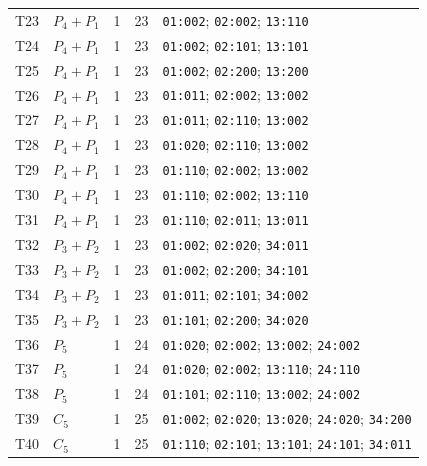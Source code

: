 \begin{longtable}{llrrp{78mm}}
T23 & $P_{4}+P_{1}$ & 1 & 23 & \texttt{01:002}; \texttt{02:002}; \texttt{13:110}\\
T24 & $P_{4}+P_{1}$ & 1 & 23 & \texttt{01:002}; \texttt{02:101}; \texttt{13:101}\\
T25 & $P_{4}+P_{1}$ & 1 & 23 & \texttt{01:002}; \texttt{02:200}; \texttt{13:200}\\
T26 & $P_{4}+P_{1}$ & 1 & 23 & \texttt{01:011}; \texttt{02:002}; \texttt{13:002}\\
T27 & $P_{4}+P_{1}$ & 1 & 23 & \texttt{01:011}; \texttt{02:110}; \texttt{13:002}\\
T28 & $P_{4}+P_{1}$ & 1 & 23 & \texttt{01:020}; \texttt{02:110}; \texttt{13:002}\\
T29 & $P_{4}+P_{1}$ & 1 & 23 & \texttt{01:110}; \texttt{02:002}; \texttt{13:002}\\
T30 & $P_{4}+P_{1}$ & 1 & 23 & \texttt{01:110}; \texttt{02:002}; \texttt{13:110}\\
T31 & $P_{4}+P_{1}$ & 1 & 23 & \texttt{01:110}; \texttt{02:011}; \texttt{13:011}\\
T32 & $P_{3}+P_{2}$ & 1 & 23 & \texttt{01:002}; \texttt{02:020}; \texttt{34:011}\\
T33 & $P_{3}+P_{2}$ & 1 & 23 & \texttt{01:002}; \texttt{02:200}; \texttt{34:101}\\
T34 & $P_{3}+P_{2}$ & 1 & 23 & \texttt{01:011}; \texttt{02:101}; \texttt{34:002}\\
T35 & $P_{3}+P_{2}$ & 1 & 23 & \texttt{01:101}; \texttt{02:200}; \texttt{34:020}\\
T36 & $P_{5}$ & 1 & 24 & \texttt{01:020}; \texttt{02:002}; \texttt{13:002}; \texttt{24:002}\\
T37 & $P_{5}$ & 1 & 24 & \texttt{01:020}; \texttt{02:002}; \texttt{13:110}; \texttt{24:110}\\
T38 & $P_{5}$ & 1 & 24 & \texttt{01:101}; \texttt{02:110}; \texttt{13:002}; \texttt{24:002}\\
T39 & $C_{5}$ & 1 & 25 & \texttt{01:002}; \texttt{02:020}; \texttt{13:020}; \texttt{24:020}; \texttt{34:200}\\
T40 & $C_{5}$ & 1 & 25 & \texttt{01:110}; \texttt{02:101}; \texttt{13:101}; \texttt{24:101}; \texttt{34:011}\\
\end{longtable}
\endgroup
